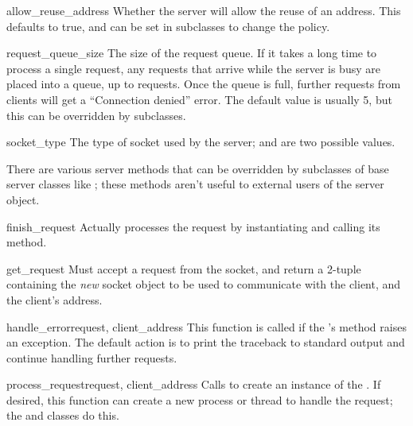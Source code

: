 \begin{datadesc}{allow_reuse_address}
Whether the server will allow the reuse of an address. This defaults
to true, and can be set in subclasses to change the policy.
\end{datadesc}

\begin{datadesc}{request_queue_size}
The size of the request queue.  If it takes a long time to process a
single request, any requests that arrive while the server is busy are
placed into a queue, up to  requests.  Once
the queue is full, further requests from clients will get a
``Connection denied'' error.  The default value is usually 5, but this
can be overridden by subclasses.
\end{datadesc}

\begin{datadesc}{socket_type}
The type of socket used by the server; 
and  are two possible values.
\end{datadesc}

There are various server methods that can be overridden by subclasses
of base server classes like ; these methods aren't
useful to external users of the server object.


\begin{funcdesc}{finish_request}{}
Actually processes the request by instantiating
 and calling its  method.
\end{funcdesc}

\begin{funcdesc}{get_request}{}
Must accept a request from the socket, and return a 2-tuple containing
the \emph{new} socket object to be used to communicate with the
client, and the client's address.
\end{funcdesc}

\begin{funcdesc}{handle_error}{request, client_address}
This function is called if the 's
 method raises an exception.  The default action is
to print the traceback to standard output and continue handling
further requests.
\end{funcdesc}

\begin{funcdesc}{process_request}{request, client_address}
Calls  to create an instance of the
.  If desired, this function can create a
new process or thread to handle the request; the 
and  classes do this.
\end{funcdesc}

